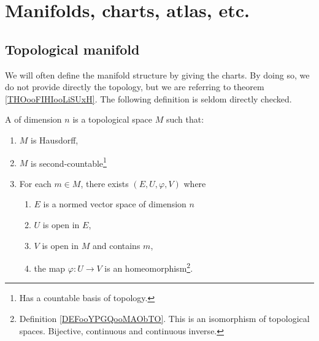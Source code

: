 
\section{Manifolds, charts, atlas, etc.}

\subsection{Topological manifold}


We will often define the manifold structure by giving the charts. By doing so, we do not provide directly the topology, but we are referring to theorem \ref{THOooFIHIooLiSUxH}. The following definition is seldom directly checked.
\begin{definition}				\label{DEFooJOMAooZscKwn}
	A  of dimension \( n\) is a topological space \( M\) such that:
	\begin{enumerate}
		\item		\label{ITEMooZZXHooPICcjz}
		      \( M\) is Hausdorff,
		\item		\label{ITEMooKOSMooSawqbB}
		      \( M\) is second-countable\footnote{Has a countable basis of topology.}
		\item		\label{ITEMooJOPDooPiOadZ}
		      For each \( m\in M\), there exists \( (E,U,\varphi,V)\) where
		      \begin{enumerate}
			      \item
			            \( E\) is a normed vector space of dimension \( n\)
			      \item
			            \( U\) is open in \( E\),
			      \item
			            \( V\) is open in \( M\) and contains \( m\),
			      \item
			            the map \(\varphi \colon U\to V  \) is an homeomorphism\footnote{Definition \ref{DEFooYPGQooMAObTO}. This is an isomorphism of topological spaces. Bijective, continuous and continuous inverse.}.
		      \end{enumerate}
	\end{enumerate}
\end{definition}

